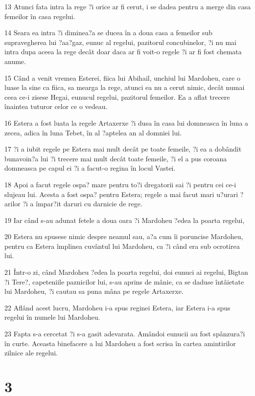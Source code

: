 \par 13 Atunci fata intra la rege ?i orice ar fi cerut, i se dadea pentru a merge din casa femeilor în casa regelui.
\par 14 Seara ea intra ?i diminea?a se ducea în a doua casa a femeilor sub supravegherea lui ?aa?gaz, eunuc al regelui, pazitorul concubinelor, ?i nu mai intra dupa aceea la rege decât doar daca ar fi voit-o regele ?i ar fi fost chemata anume.
\par 15 Când a venit vremea Esterei, fiica lui Abihail, unchiul lui Mardoheu, care o luase la sine ca fiica, sa mearga la rege, atunci ea nu a cerut nimic, decât numai ceea ce-i zisese Hegai, eunucul regelui, pazitorul femeilor. Ea a aflat trecere înaintea tuturor celor ce o vedeau.
\par 16 Estera a fost luata la regele Artaxerxe ?i dusa în casa lui domneasca în luna a zecea, adica în luna Tebet, în al ?aptelea an al domniei lui.
\par 17 ?i a iubit regele pe Estera mai mult decât pe toate femeile, ?i ea a dobândit bunavoin?a lui ?i trecere mai mult decât toate femeile, ?i el a pus coroana domneasca pe capul ei ?i a facut-o regina în locul Vastei.
\par 18 Apoi a facut regele ospa? mare pentru to?i dregatorii sai ?i pentru cei ce-i slujeau lui. Acesta a fost ospa? pentru Estera; regele a mai facut mari u?urari ?arilor ?i a împar?it daruri cu darnicie de rege.
\par 19 Iar când s-au adunat fetele a doua oara ?i Mardoheu ?edea la poarta regelui,
\par 20 Estera nu spusese nimic despre neamul sau, a?a cum îi poruncise Mardoheu, pentru ca Estera împlinea cuvântul lui Mardoheu, ca ?i când era sub ocrotirea lui.
\par 21 Într-o zi, când Mardoheu ?edea la poarta regelui, doi eunuci ai regelui, Bigtan ?i Tere?, capeteniile paznicilor lui, s-au aprins de mânie, ca se daduse întâietate lui Mardoheu, ?i cautau sa puna mâna pe regele Artaxerxe.
\par 22 Aflând acest lucru, Mardoheu i-a spus reginei Estera, iar Estera i-a spus regelui în numele lui Mardoheu.
\par 23 Fapta s-a cercetat ?i s-a gasit adevarata. Amândoi eunucii au fost spânzura?i în curte. Aceasta binefacere a lui Mardoheu a fost scrisa în cartea amintirilor zilnice ale regelui.

\chapter{3}


